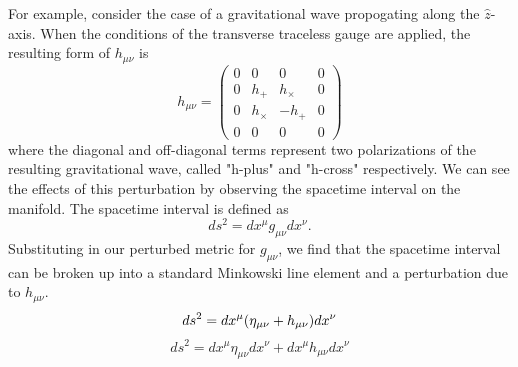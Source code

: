 For example, consider the case of a gravitational 
wave propogating along the $\hat{z}$-axis.
When the conditions of the transverse traceless gauge are applied, 
the resulting form of $h_{\mu\nu}$ is 
\begin{equation}
h_{\mu\nu} = 
  \begin{pmatrix}
    0 & 0 & 0 & 0 \\
    0 & h_+ & h_\times & 0 \\
    0 & h_\times & -h_+ & 0 \\
    0 & 0 & 0 & 0
  \end{pmatrix}
\end{equation}
where the diagonal and off-diagonal terms represent two polarizations 
of the resulting gravitational wave, called "h-plus" and "h-cross" 
respectively.
We can see the effects of this perturbation by observing the  
spacetime interval on the manifold. The spacetime interval is defined as 
\begin{equation}
ds^2 = dx^\mu g_{\mu\nu}dx^\nu.
\end{equation}
Substituting in our perturbed metric for $g_{\mu\nu}$, we find that 
the spacetime interval can be broken up into a standard Minkowski line 
element and a perturbation due to $h_{\mu\nu}$.
\begin{equation}
ds^2 = dx^\mu (\eta_{\mu\nu} + h_{\mu\nu})dx^\nu \\
\end{equation}
\begin{equation}
ds^2 = dx^\mu \eta_{\mu\nu} dx^\nu + dx^\mu h_{\mu\nu}dx^\nu
\label{eq:spacetime}
\end{equation}

